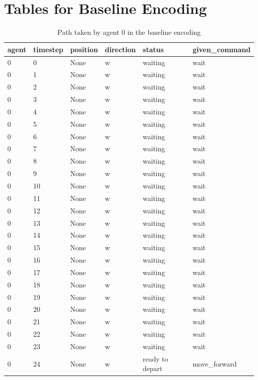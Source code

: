 \section{Tables for Baseline Encoding}

\begin{table}[H]
  \centering
  \caption{Path taken by agent 0 in the baseline encoding}
  \label{tab:baseline0}
  \begin{tabular}{llllll}
    \toprule
    agent & timestep & position & direction & status & given\_command \\
    \midrule
    0 & 0 & None & w & waiting & wait \\
    0 & 1 & None & w & waiting & wait \\
    0 & 2 & None & w & waiting & wait \\
    0 & 3 & None & w & waiting & wait \\
    0 & 4 & None & w & waiting & wait \\
    0 & 5 & None & w & waiting & wait \\
    0 & 6 & None & w & waiting & wait \\
    0 & 7 & None & w & waiting & wait \\
    0 & 8 & None & w & waiting & wait \\
    0 & 9 & None & w & waiting & wait \\
    0 & 10 & None & w & waiting & wait \\
    0 & 11 & None & w & waiting & wait \\
    0 & 12 & None & w & waiting & wait \\
    0 & 13 & None & w & waiting & wait \\
    0 & 14 & None & w & waiting & wait \\
    0 & 15 & None & w & waiting & wait \\
    0 & 16 & None & w & waiting & wait \\
    0 & 17 & None & w & waiting & wait \\
    0 & 18 & None & w & waiting & wait \\
    0 & 19 & None & w & waiting	 & wait \\
    0 & 20 & None & w & waiting & wait \\
    0 & 21 & None & w & waiting & wait \\
    0 & 22 & None & w & waiting & wait \\
    0 & 23 & None & w & waiting & wait \\
    0 & 24 & None & w & ready to depart & move\_forward \\

\end{tabular}
\end{table}
